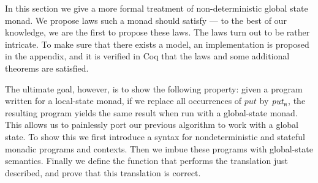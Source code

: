\documentclass{llncs}
\newcommand{\Varid}[1]{\mathit{#1}}
\let\Varid\mathit
\begin{document}
In this section we give a more formal treatment of non-deterministic global state monad.
We propose laws such a monad should satisfy --- to the best of our knowledge, we are the first to propose these laws.
The laws turn out to be rather intricate.
To make sure that there exists a model, an implementation is proposed in the appendix, and it is verified in Coq that the laws and some additional theorems are satisfied.

The ultimate goal, however, is to show the following property:
given a program written for a local-state monad,
if we replace all occurrences of \ensuremath{\Varid{put}} by \ensuremath{\Varid{put}_{\scaleobj{0.7}{\sf R}}}, the resulting
program yields the same result when run with a global-state monad.
This allows us to painlessly port our previous algorithm to work
with a global state.
To show this we first introduce a syntax for nondeterministic and stateful
monadic programs and contexts.
Then we imbue these programs with global-state semantics.
Finally we define the function that performs the translation just described, and prove that this translation is correct.
\end{document}
